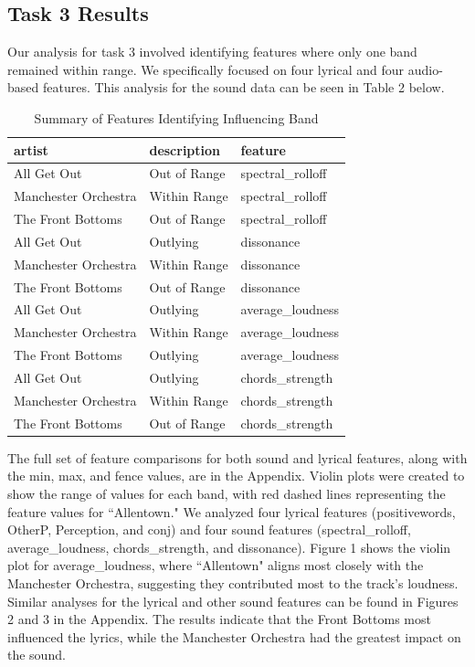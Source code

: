 \documentclass{article}\usepackage[]{graphicx}\usepackage[]{xcolor}
\begin{document}
\begin{multicols}{2}
\subsection{Task 3 Results}
Our analysis for task 3 involved identifying features where only one band remained within range. We specifically focused on four lyrical and four audio-based features. This analysis for the sound data can be seen in Table 2 below.



\begin{table}[H]
\centering
\begingroup\small
\begin{tabular}{lll}
  \hline
artist & description & feature \\ 
  \hline
All Get Out & Out of Range & spectral\_rolloff \\ 
  Manchester Orchestra & Within Range & spectral\_rolloff \\ 
  The Front Bottoms & Out of Range & spectral\_rolloff \\ 
  All Get Out & Outlying & dissonance \\ 
  Manchester Orchestra & Within Range & dissonance \\ 
  The Front Bottoms & Out of Range & dissonance \\ 
  All Get Out & Outlying & average\_loudness \\ 
  Manchester Orchestra & Within Range & average\_loudness \\ 
  The Front Bottoms & Outlying & average\_loudness \\ 
  All Get Out & Outlying & chords\_strength \\ 
  Manchester Orchestra & Within Range & chords\_strength \\ 
  The Front Bottoms & Out of Range & chords\_strength \\ 
   \hline
\end{tabular}
\endgroup
\caption{Summary of Features Identifying Influencing Band} 
\end{table}

The full set of feature comparisons for both sound and lyrical features, along with the min, max, and fence values, are in the Appendix. Violin plots were created to show the range of values for each band, with red dashed lines representing the feature values for ``Allentown." We analyzed four lyrical features (positivewords, OtherP, Perception, and conj) and four sound features (spectral\_rolloff, average\_loudness, chords\_strength, and dissonance). Figure 1 shows the violin plot for average\_loudness, where ``Allentown" aligns most closely with the Manchester Orchestra, suggesting they contributed most to the track's loudness. Similar analyses for the lyrical and other sound features can be found in Figures 2 and 3 in the Appendix. The results indicate that the Front Bottoms most influenced the lyrics, while the Manchester Orchestra had the greatest impact on the sound.


\end{multicols}
\end{document}
